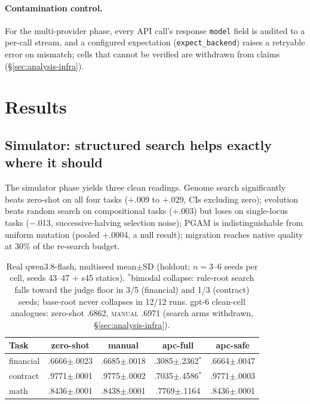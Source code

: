 \documentclass[11pt]{article}
\newcommand{\zs}{zero-shot}
\begin{document}
\paragraph{Contamination control.} For the multi-provider phase, every API call's response \texttt{model} field is audited to a per-call stream, and a configured expectation (\texttt{expect\_backend}) raises a retryable error on mismatch; cells that cannot be verified are withdrawn from claims (\S\ref{sec:analysis-infra}).

\section{Results}
\label{sec:results}

\subsection{Simulator: structured search helps exactly where it should}
\label{sec:results-sim}

The simulator phase yields three clean readings. Genome search significantly beats \zs{} on all four tasks ($+$.009 to $+$.029, CIs excluding zero); evolution beats random search on compositional tasks ($+$.003) but loses on single-locus tasks ($-$.013, successive-halving selection noise); PGAM is indistinguishable from uniform mutation (pooled $+$.0004, a null result); migration reaches native quality at 30\% of the re-search budget.

\begin{table}[t]
\centering\small
\begin{tabular}{lcccc}
\toprule
Task & \zs{} & manual & apc-full & apc-safe \\
\midrule
financial  & .6666$\pm$.0023 & .6685$\pm$.0018 & .3085$\pm$.2362$^{*}$ & .6664$\pm$.0047 \\
contract   & .9771$\pm$.0001 & .9775$\pm$.0002 & .7035$\pm$.4586$^{*}$ & .9771$\pm$.0003 \\
math       & .8436$\pm$.0001 & .8438$\pm$.0001 & .7769$\pm$.1164 & .8436$\pm$.0001 \\
\bottomrule
\end{tabular}
\caption{Real qwen3.8-flash, multiseed mean$\pm$SD (holdout; $n{=}3$--$6$ seeds per cell, seeds 43--47 + s45 statics). $^{*}$bimodal collapse: rule-root search falls toward the judge floor in 3/5 (financial) and 1/3 (contract) seeds; base-root never collapses in 12/12 runs. gpt-6 clean-cell analogues: \zs{} .6862, \textsc{manual} .6971 (search arms withdrawn, \S\ref{sec:analysis-infra}).}
\label{tab:real-qwen}
\end{table}
\end{document}
